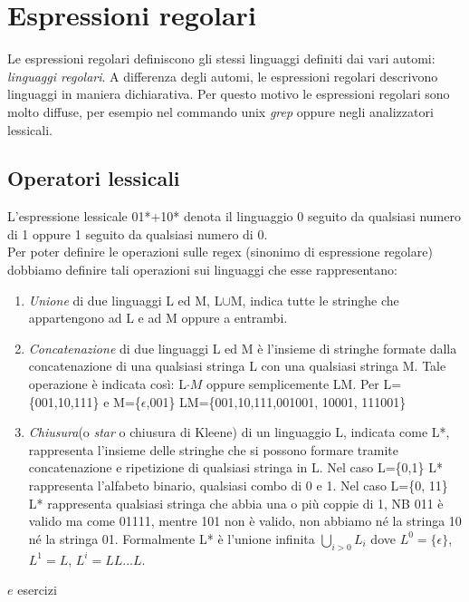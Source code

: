 \documentclass[12pt]{article}
\begin{document}
\newpage
\section{Espressioni regolari}
Le espressioni regolari definiscono gli stessi linguaggi definiti dai vari automi: \emph{linguaggi regolari}. A differenza degli automi, le espressioni regolari descrivono linguaggi in maniera dichiarativa. Per questo motivo le espressioni regolari sono molto diffuse, per esempio nel commando unix \emph{grep} oppure negli analizzatori lessicali.
\subsection{Operatori lessicali}
L'espressione lessicale 01*+10* denota il linguaggio 0 seguito da qualsiasi numero di 1 oppure 1 seguito da qualsiasi numero di 0.
\\ Per poter definire le operazioni sulle regex (sinonimo di espressione regolare) dobbiamo definire tali operazioni sui linguaggi che esse rappresentano: 
\begin{enumerate}
  \item \emph{Unione} di due linguaggi L ed M, L$\cup$M, indica tutte le stringhe che appartengono ad L e ad M oppure a entrambi.
  \item \emph{Concatenazione} di due linguaggi L ed M è l'insieme di stringhe formate dalla concatenazione di una qualsiasi stringa L con una qualsiasi stringa M. Tale operazione è indicata così: L$\cdot M$ oppure semplicemente LM. 
     Per L=\{001,10,111\} e M=\{$\epsilon$,001\} 
     LM=\{001,10,111,001001, 10001, 111001\}
   \item \emph{Chiusura}(o \emph{star} o chiusura di Kleene) di un linguaggio L, indicata come L*, rappresenta l'insieme delle stringhe che si possono formare tramite concatenazione e ripetizione di qualsiasi stringa in L. Nel caso L=\{0,1\} L* rappresenta l'alfabeto binario, qualsiasi combo di 0 e 1. Nel caso L=\{0, 11\} L* rappresenta qualsiasi stringa che abbia una o più coppie di 1, NB 011 è valido ma come 01111, mentre 101 non è valido, non abbiamo né la stringa 10 né la stringa 01. Formalmente L* è l'unione infinita $\bigcup_{i>0}L_i$ dove $L^0=\{\epsilon\}$, $L^1=L$, $L^i=LL...L$.
\end{enumerate}

$e$
\newpage
{esercizi}
\end{document}
